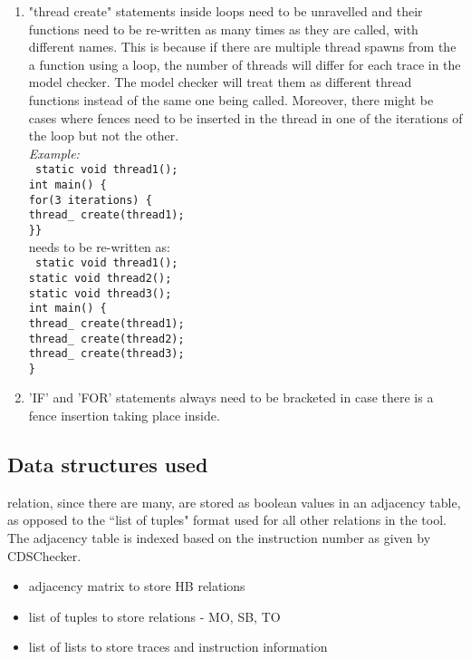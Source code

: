 \begin{enumerate}
	\item "thread create" statements inside loops need to be unravelled and their functions need to be re-written as many times as they are called, with different names. This is because if there are multiple thread spawns from the a function using a loop, the number of threads will differ for each trace in the model checker. The model checker will treat them as different thread functions instead of the same one being called. Moreover, there might be cases where fences need to be inserted in the thread in one of the iterations of the loop but not the other.\\
	\textit{Example:}\\ \texttt{%
	static void thread1();\\
	int main() \{\\
	\hspace{10mm} for(3 iterations) \{\\
	thread\_ create(thread1);\\
	\}\}%
	}\\ needs to be re-written as:\\
	\texttt{%
	static void thread1();\\
	static void thread2();\\
	static void thread3();\\
	int main() \{\\
	thread\_ create(thread1);\\
	thread\_ create(thread2);\\
	thread\_ create(thread3);\\
	\}%
	}
	
	\item 'IF' and 'FOR' statements always need to be bracketed in case there is a fence insertion taking place inside.
\end{enumerate}

\subsection{Data structures used}
\setHB relation, since there are many, are stored as boolean values in 
an adjacency table, as opposed to the ``list of tuples" format used for 
all other relations in the tool. The adjacency table is indexed based 
on the instruction number as given by CDSChecker. 

\begin{itemize}
	\item adjacency matrix to store HB relations
	\item list of tuples to store relations - MO, SB, TO
	\item list of lists to store traces and instruction information
\end{itemize}

